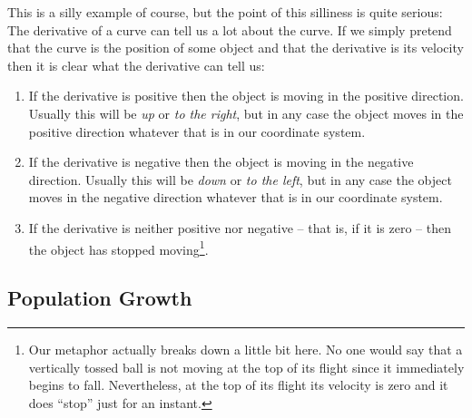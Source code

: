 This is a silly example of course, but the point of this silliness is
quite serious: The derivative of a curve can tell us a lot about the
curve. If  we simply pretend that the curve is the position of some
object and that the derivative is its velocity then it is clear what
the derivative can tell us:
\begin{enumerate}\label{list:FirstDerivTest-Newton}
\item If the derivative is positive then the object is moving in the
  positive direction. Usually this will be \emph{up} or \emph{to the
    right}, but in any case the object moves in the positive direction
  whatever that is in our coordinate system.
\item If the derivative is negative then the object is moving in the
  negative direction. Usually this will be \emph{down} or \emph{to the
    left}, but in any case the object moves in the negative direction
  whatever that is in our coordinate system.
\item If the derivative is neither positive nor negative -- that is,
  if it is zero -- then the object has stopped moving\footnote{Our
    metaphor actually breaks down a little bit here. No one would say
    that a vertically tossed ball is not moving at the top of its
    flight since it immediately begins to fall. Nevertheless, at the
    top of its flight its velocity is zero and it does ``stop'' just
    for an instant.
  }.
\end{enumerate}

\subsection{Population Growth}
\label{sec:population-growth}


